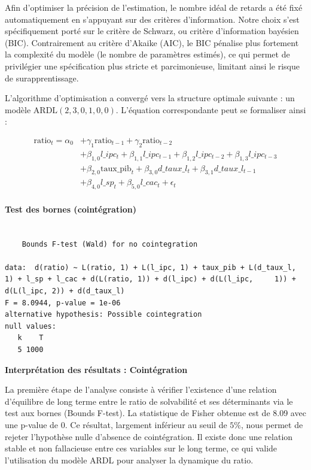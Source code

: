 \documentclass[
]{article}
\begin{document}
Afin d'optimiser la précision de l'estimation, le nombre idéal de
retards a été fixé automatiquement en s'appuyant sur des critères
d'information. Notre choix s'est spécifiquement porté sur le critère de
Schwarz, ou critère d'information bayésien (BIC). Contrairement au
critère d'Akaike (AIC), le BIC pénalise plus fortement la complexité du
modèle (le nombre de paramètres estimés), ce qui permet de privilégier
une spécification plus stricte et parcimonieuse, limitant ainsi le
risque de surapprentissage.

L'algorithme d'optimisation a convergé vers la structure optimale
suivante : un modèle \(\text{ARDL}(2, 3, 0, 1, 0, 0)\). L'équation
correspondante peut se formaliser ainsi :

\[\begin{aligned}
\text{ratio}_t = \alpha_0 & + \gamma_1 \text{ratio}_{t-1} + \gamma_2 \text{ratio}_{t-2} \\
& + \beta_{1,0} l\_ipc_t + \beta_{1,1} l\_ipc_{t-1} + \beta_{1,2} l\_ipc_{t-2} + \beta_{1,3} l\_ipc_{t-3} \\
& + \beta_{2,0} \text{taux\_pib}_t + \beta_{3,0} d\_taux\_l_t + \beta_{3,1} d\_taux\_l_{t-1} \\
& + \beta_{4,0} l\_sp_t + \beta_{5,0} l\_cac_t + \epsilon_t
\end{aligned}\]

\paragraph{Test des bornes
(cointégration)}\label{test-des-bornes-cointuxe9gration}

\begin{verbatim}

    Bounds F-test (Wald) for no cointegration

data:  d(ratio) ~ L(ratio, 1) + L(l_ipc, 1) + taux_pib + L(d_taux_l,     1) + l_sp + l_cac + d(L(ratio, 1)) + d(l_ipc) + d(L(l_ipc,     1)) + d(L(l_ipc, 2)) + d(d_taux_l)
F = 8.0944, p-value = 1e-06
alternative hypothesis: Possible cointegration
null values:
   k    T 
   5 1000 
\end{verbatim}

\textbf{Interprétation des résultats : Cointégration}

La première étape de l'analyse consiste à vérifier l'existence d'une
relation d'équilibre de long terme entre le ratio de solvabilité et ses
déterminants via le test aux bornes (Bounds F-test). La statistique de
Fisher obtenue est de 8.09 avec une p-value de 0. Ce résultat, largement
inférieur au seuil de \(5 \%\), nous permet de rejeter l'hypothèse nulle
d'absence de cointégration. Il existe donc une relation stable et non
fallacieuse entre ces variables sur le long terme, ce qui valide
l'utilisation du modèle ARDL pour analyser la dynamique du ratio.
\end{document}
